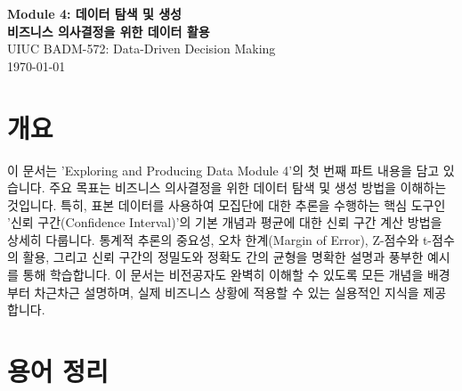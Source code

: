 \documentclass[11pt,a4paper]{article}
\begin{document}
\begin{center}
  \Huge \textbf{Module 4: 데이터 탐색 및 생성} \\
  \Large \textbf{비즈니스 의사결정을 위한 데이터 활용} \\
  \vspace{1cm}
  \normalsize UIUC BADM-572: Data-Driven Decision Making \\
  \today
\end{center}

\newpage
\tableofcontents

\newpage
\section*{개요}
이 문서는 'Exploring and Producing Data Module 4'의 첫 번째 파트 내용을 담고 있습니다.
주요 목표는 비즈니스 의사결정을 위한 데이터 탐색 및 생성 방법을 이해하는 것입니다.
특히, 표본 데이터를 사용하여 모집단에 대한 추론을 수행하는 핵심 도구인 '신뢰 구간(Confidence Interval)'의 기본 개념과 평균에 대한 신뢰 구간 계산 방법을 상세히 다룹니다.
통계적 추론의 중요성, 오차 한계(Margin of Error), Z-점수와 t-점수의 활용, 그리고 신뢰 구간의 정밀도와 정확도 간의 균형을 명확한 설명과 풍부한 예시를 통해 학습합니다.
이 문서는 비전공자도 완벽히 이해할 수 있도록 모든 개념을 배경부터 차근차근 설명하며, 실제 비즈니스 상황에 적용할 수 있는 실용적인 지식을 제공합니다.

\newpage
\section*{용어 정리}
\end{document}
